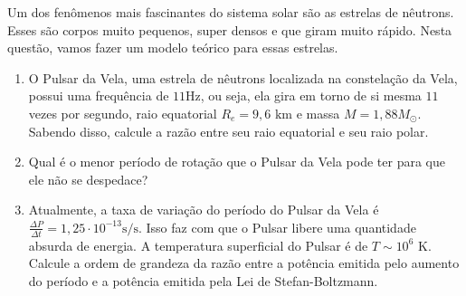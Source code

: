 \documentclass[11pt]{article}
\begin{document}
\begin{pproblem} Um dos fenômenos mais fascinantes do sistema solar são as estrelas de nêutrons. Esses são corpos muito pequenos, super densos e que giram muito rápido. Nesta questão, vamos fazer um modelo teórico para essas estrelas.
    \begin{enumerate}[label=\textbf{\alph*)}]
        \item O Pulsar da Vela, uma estrela de nêutrons localizada na constelação da Vela, possui uma frequência de \(11 \text{Hz}\), ou seja, ela gira em torno de si mesma \(11\) vezes por segundo, raio equatorial \(R_e = 9,6\text{ km}\) e massa \(M = 1,88M_\odot\). Sabendo disso, calcule a razão entre seu raio equatorial e seu raio polar.
        \item Qual é o menor período de rotação que o Pulsar da Vela pode ter para que ele não se despedace?
        \item Atualmente, a taxa de variação do período do Pulsar da Vela é \(\frac{\Delta P}{\Delta t} = 1,25 \cdot 10^{-13}\text{s/s}\). Isso faz com que o Pulsar libere uma quantidade absurda de energia. A temperatura superficial do Pulsar é de \(T \sim 10^6\text{ K}\). Calcule a ordem de grandeza da razão entre a potência emitida pelo aumento do período e a potência emitida pela Lei de Stefan-Boltzmann.
    \end{enumerate}
    
\end{pproblem}
\end{document}
